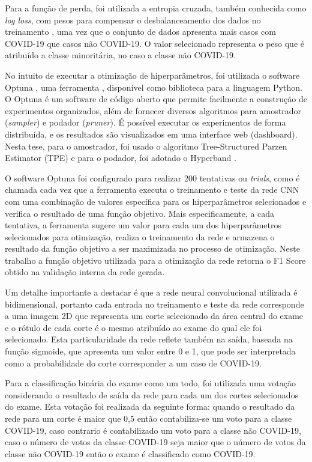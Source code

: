 Para a função de perda, foi utilizada a entropia cruzada, também conhecida como \textit{log loss}, com pesos para compensar o desbalanceamento dos dados no treinamento \cite{rezaei2020addressing}, uma vez que o conjunto de dados apresenta mais casos com COVID-19 que casos não COVID-19. O valor selecionado representa o peso que é atribuído a classe minoritária, no caso a classe não COVID-19.

No intuito de executar a otimização de hiperparâmetros, foi utilizada o software Optuna \cite{akiba2019optuna}, uma ferramenta \cite{akiba2019optuna}, disponível como biblioteca para a linguagem Python. O Optuna é um software de código aberto que permite facilmente a construção de experimentos organizados, além de fornecer diversos algoritmos para amostrador (\textit{sampler}) e podador (\textit{pruner}). É possível executar os experimentos de forma distribuída, e os resultados são visualizados em uma interface web (dashboard). Nesta tese, para o amostrador, foi usado o algoritmo Tree-Structured Parzen Estimator (TPE) \cite{bergstra2013making} e para o podador, foi adotado o Hyperband \cite{Li2017}. 

O software Optuna foi configurado para realizar 200 tentativas ou \textit{trials}, como é chamada cada vez que a ferramenta executa o treinamento e teste da rede CNN com uma combinação de valores específica para os hiperparâmetros selecionados e verifica o resultado de uma função objetivo. Mais especificamente, a cada tentativa, a ferramenta sugere um valor para cada um dos hiperparâmetros selecionados para otimização, realiza o treinamento da rede e armazena o resultado da função objetivo a ser maximizada no processo de otimização. Neste trabalho a função objetivo utilizada para a otimização da rede retorna o F1 Score obtido na validação interna da rede gerada.

Um detalhe importante a destacar é que a rede neural convolucional utilizada é bidimensional, portanto cada entrada no treinamento e teste da rede corresponde a uma imagem 2D que representa um corte selecionado da área central do exame e o rótulo de cada corte é o mesmo atribuído ao exame do qual ele foi selecionado. Esta particularidade da rede reflete também na saída, baseada na função sigmoide, que apresenta um valor entre 0 e 1, que pode ser interpretada como a probabilidade do corte corresponder a um caso de COVID-19.

Para a classificação binária do exame como um todo, foi utilizada uma votação considerando o resultado de saída da rede para cada um dos cortes selecionados do exame. Esta votação foi realizada da seguinte forma: quando o resultado da rede para um corte é maior que 0,5 então contabiliza-se um voto para a classe COVID-19, caso contrario é contabilizado um voto para a classe não COVID-19, caso o número de votos da classe COVID-19 seja maior que o número de votos da classe não COVID-19 então o exame é classificado como COVID-19.

